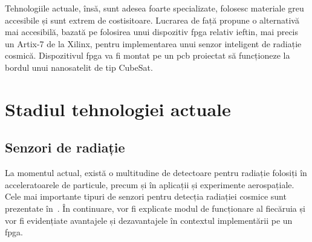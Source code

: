 \documentclass[12pt,a4paper]{report}
\begin{document}
Tehnologiile actuale, însă, sunt adesea foarte specializate, folosesc materiale greu accesibile și sunt extrem de costisitoare. Lucrarea de față propune o alternativă mai accesibilă, bazată pe folosirea unui dispozitiv \gls{fpga} relativ ieftin, mai precis un Artix-7 de la Xilinx, pentru implementarea unui senzor inteligent de radiație cosmică. Dispozitivul \gls{fpga} va fi montat pe un \gls{pcb} proiectat să funcționeze la bordul unui nanosatelit de tip CubeSat.

\section{Stadiul tehnologiei actuale}
\subsection{Senzori de radiație}
La momentul actual, există o multitudine de detectoare pentru radiație folosiți în acceleratoarele de particule, precum și în aplicații și experimente aerospațiale. Cele mai importante tipuri de senzori pentru detecția radiației cosmice sunt prezentate în~\cite{radiation_sensor_types}. În continuare, vor fi explicate modul de funcționare al fiecăruia și vor fi evidențiate avantajele și dezavantajele în contextul implementării pe un \gls{fpga}.
\end{document}
